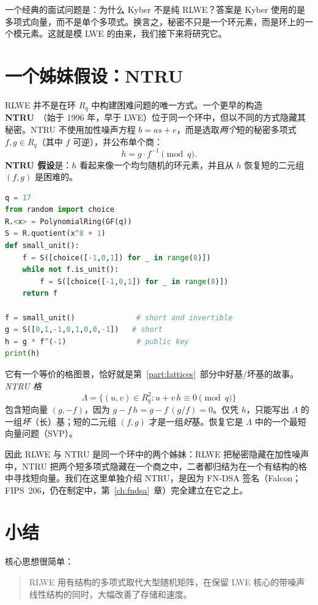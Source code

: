 一个经典的面试问题是：为什么 Kyber 不是纯 RLWE？答案是 Kyber 使用的是多项式向量，而不是单个多项式。换言之，秘密不只是一个环元素，而是环上的一个模元素。这就是模 LWE 的由来，我们接下来将研究它。

\section{一个姊妹假设：NTRU}
\label{sec:ntru}

RLWE 并不是在环 $R_q$ 中构建困难问题的唯一方式。一个更早的构造 \textbf{NTRU}~\cite{ntru1998}（始于 1996 年，早于 LWE）位于同一个环中，但以不同的方式隐藏其秘密。NTRU 不使用加性噪声方程 $b = a s + e$，而是选取\emph{两个}短的秘密多项式 $f, g \in R_q$（其中 $f$ 可逆），并公布单个商：
\[
h = g \cdot f^{-1} \pmod q.
\]
\textbf{NTRU 假设}是：$h$ 看起来像一个均匀随机的环元素，并且从 $h$ 恢复短的二元组 $(f,g)$ 是困难的。

\begin{lstlisting}[language=Python]
q = 17
from random import choice
R.<x> = PolynomialRing(GF(q))
S = R.quotient(x^8 + 1)
def small_unit():
    f = S([choice([-1,0,1]) for _ in range(8)])
    while not f.is_unit():
        f = S([choice([-1,0,1]) for _ in range(8)])
    return f

f = small_unit()              # short and invertible
g = S([0,1,-1,0,1,0,0,-1])   # short
h = g * f^(-1)                # public key
print(h)
\end{lstlisting}

它有一个等价的格图景，恰好就是第~\ref{part:lattices}~部分中好基/坏基的故事。\emph{NTRU 格}
\[
\Lambda = \{ (u,v) \in R_q^2 : u + v\,h \equiv 0 \pmod q \}
\]
包含短向量 $(g, -f)$，因为 $g - f\,h = g - f\,(g/f) = 0$。仅凭 $h$，只能写出 $\Lambda$ 的一组\emph{坏}（长）基；短的二元组 $(f,g)$ 才是一组\emph{好}基。恢复它是 $\Lambda$ 中的一个最短向量问题（SVP）。

因此 RLWE 与 NTRU 是同一个环中的两个姊妹：RLWE 把秘密隐藏在加性噪声中，NTRU 把两个短多项式隐藏在一个商之中，二者都归结为在一个有结构的格中寻找短向量。我们在这里单独介绍 NTRU，是因为 FN-DSA 签名（Falcon；FIPS~206，仍在制定中，第~\ref{ch:fndsa}~章）完全建立在它之上。

\section{小结}

核心思想很简单：

\begin{quote}
RLWE 用有结构的多项式取代大型随机矩阵，在保留 LWE 核心的带噪声线性结构的同时，大幅改善了存储和速度。
\end{quote}

